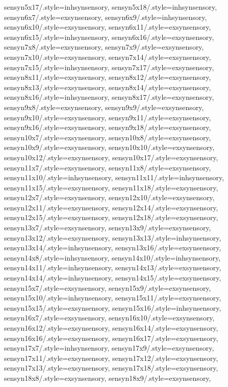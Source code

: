 {sensyn5x17/.style={inhsynsensory},
sensyn5x18/.style={inhsynsensory},
sensyn6x7/.style={exsynsensory},
sensyn6x9/.style={inhsynsensory},
sensyn6x10/.style={exsynsensory},
sensyn6x11/.style={exsynsensory},
sensyn6x15/.style={inhsynsensory},
sensyn6x16/.style={exsynsensory},
sensyn7x8/.style={exsynsensory},
sensyn7x9/.style={exsynsensory},
sensyn7x10/.style={exsynsensory},
sensyn7x14/.style={exsynsensory},
sensyn7x15/.style={inhsynsensory},
sensyn7x17/.style={exsynsensory},
sensyn8x11/.style={exsynsensory},
sensyn8x12/.style={exsynsensory},
sensyn8x13/.style={exsynsensory},
sensyn8x14/.style={exsynsensory},
sensyn8x16/.style={inhsynsensory},
sensyn8x17/.style={exsynsensory},
sensyn9x8/.style={exsynsensory},
sensyn9x9/.style={exsynsensory},
sensyn9x10/.style={exsynsensory},
sensyn9x11/.style={exsynsensory},
sensyn9x16/.style={exsynsensory},
sensyn9x18/.style={exsynsensory},
sensyn10x7/.style={exsynsensory},
sensyn10x8/.style={exsynsensory},
sensyn10x9/.style={exsynsensory},
sensyn10x10/.style={exsynsensory},
sensyn10x12/.style={exsynsensory},
sensyn10x17/.style={exsynsensory},
sensyn11x7/.style={exsynsensory},
sensyn11x8/.style={exsynsensory},
sensyn11x10/.style={inhsynsensory},
sensyn11x11/.style={inhsynsensory},
sensyn11x15/.style={exsynsensory},
sensyn11x18/.style={exsynsensory},
sensyn12x7/.style={exsynsensory},
sensyn12x10/.style={exsynsensory},
sensyn12x11/.style={exsynsensory},
sensyn12x14/.style={exsynsensory},
sensyn12x15/.style={exsynsensory},
sensyn12x18/.style={exsynsensory},
sensyn13x7/.style={exsynsensory},
sensyn13x9/.style={exsynsensory},
sensyn13x12/.style={exsynsensory},
sensyn13x13/.style={inhsynsensory},
sensyn13x14/.style={inhsynsensory},
sensyn13x16/.style={exsynsensory},
sensyn14x8/.style={inhsynsensory},
sensyn14x10/.style={inhsynsensory},
sensyn14x11/.style={inhsynsensory},
sensyn14x13/.style={exsynsensory},
sensyn14x14/.style={inhsynsensory},
sensyn14x15/.style={exsynsensory},
sensyn15x7/.style={exsynsensory},
sensyn15x9/.style={exsynsensory},
sensyn15x10/.style={inhsynsensory},
sensyn15x11/.style={exsynsensory},
sensyn15x15/.style={exsynsensory},
sensyn15x16/.style={inhsynsensory},
sensyn16x7/.style={exsynsensory},
sensyn16x10/.style={exsynsensory},
sensyn16x12/.style={exsynsensory},
sensyn16x14/.style={exsynsensory},
sensyn16x16/.style={exsynsensory},
sensyn16x17/.style={exsynsensory},
sensyn17x7/.style={inhsynsensory},
sensyn17x9/.style={exsynsensory},
sensyn17x11/.style={exsynsensory},
sensyn17x12/.style={exsynsensory},
sensyn17x13/.style={exsynsensory},
sensyn17x18/.style={exsynsensory},
sensyn18x8/.style={exsynsensory},
sensyn18x9/.style={exsynsensory},
}

